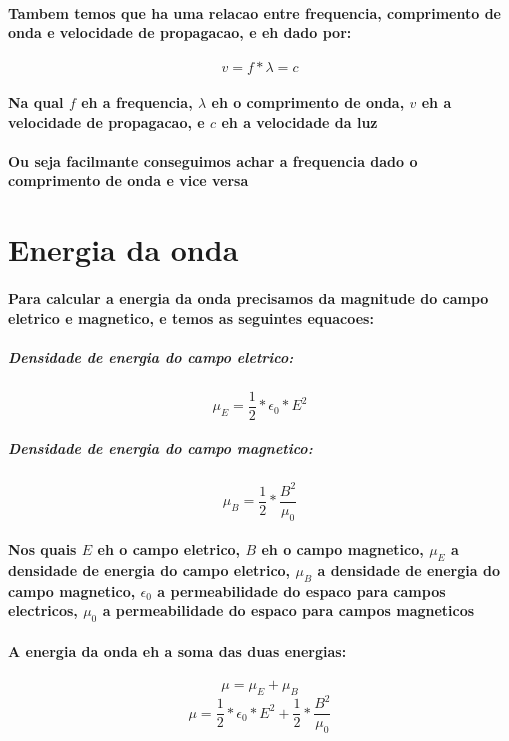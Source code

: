 \documentclass[12pt,twoside, a4paper, twocolumn]{article}
\begin{document}
\paragraph*{Tambem temos que ha uma relacao entre frequencia, comprimento de onda e velocidade de propagacao, e eh dado por:}

\begin{equation}
    v = f * \lambda = c
\end{equation}

\paragraph*{Na qual $f$ eh a frequencia, $\lambda$ eh o comprimento de onda, $v$ eh a velocidade de propagacao, e $c$ eh a velocidade da luz}
\paragraph*{Ou seja facilmante conseguimos achar a frequencia dado o comprimento de onda e vice versa}

\section{Energia da onda}
\paragraph*{Para calcular a energia da onda precisamos da magnitude do campo eletrico e magnetico, e temos as seguintes equacoes:}

\subparagraph*{Densidade de energia do campo eletrico:}
\begin{equation}
    \mu_E = \frac{1}{2} * \epsilon_0 * E^2
\end{equation}

\subparagraph*{Densidade de energia do campo magnetico:}
\begin{equation}
    \mu_B = \frac{1}{2} * \frac{B^2}{\mu_0}
\end{equation}

\paragraph{Nos quais $E$ eh o campo eletrico, $B$ eh o campo magnetico, $\mu_E$ a densidade de energia do campo eletrico, $\mu_B$ a densidade de energia do campo magnetico, $\epsilon_0$ a permeabilidade do espaco para campos electricos, $\mu_0$ a permeabilidade do espaco para campos magneticos}
\paragraph{A energia da onda eh a soma das duas energias:}
\begin{equation}
    \mu = \mu_E + \mu_B
\end{equation}
\begin{equation}
    \mu = \frac{1}{2} * \epsilon_0 * E^2 + \frac{1}{2} * \frac{B^2}{\mu_0}
\end{equation}
\end{document}
